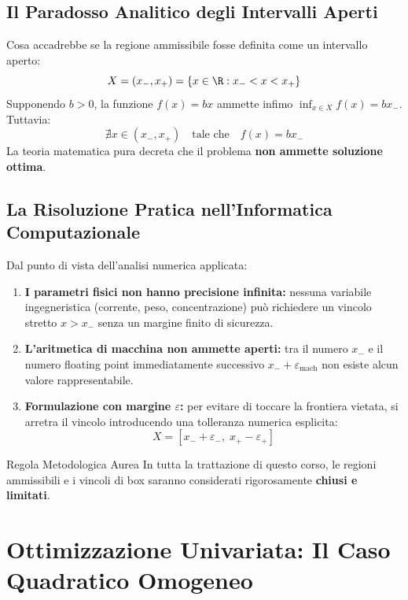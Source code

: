 \subsection{Il Paradosso Analitico degli Intervalli Aperti}
Cosa accadrebbe se la regione ammissibile fosse definita come un intervallo aperto:
\begin{equation}
X = (x_-, x_+) = \{ x \in \R : x_- < x < x_+ \}
\end{equation}
Supponendo $b > 0$, la funzione $f(x) = bx$ ammette infimo $\inf_{x \in X} f(x) = b x_-$. Tuttavia:
\begin{equation}
\nexists x \in (x_-, x_+) \quad \text{tale che} \quad f(x) = b x_-
\end{equation}
La teoria matematica pura decreta che il problema \textbf{non ammette soluzione ottima}.

\subsection{La Risoluzione Pratica nell'Informatica Computazionale}
Dal punto di vista dell'analisi numerica applicata:
\begin{enumerate}
    \item \textbf{I parametri fisici non hanno precisione infinita:} nessuna variabile ingegneristica (corrente, peso, concentrazione) pu\`o richiedere un vincolo stretto $x > x_-$ senza un margine finito di sicurezza.
    \item \textbf{L'aritmetica di macchina non ammette aperti:} tra il numero $x_-$ e il numero floating point immediatamente successivo $x_- + \varepsilon_{\text{mach}}$ non esiste alcun valore rappresentabile.
    \item \textbf{Formulazione con margine $\varepsilon$:} per evitare di toccare la frontiera vietata, si arretra il vincolo introducendo una tolleranza numerica esplicita:
    \begin{equation}
    X = [x_- + \varepsilon_-, \; x_+ - \varepsilon_+]
    \end{equation}
\end{enumerate}

\begin{noteblock}{Regola Metodologica Aurea}
In tutta la trattazione di questo corso, le regioni ammissibili e i vincoli di box saranno considerati rigorosamente \textbf{chiusi e limitati}.
\end{noteblock}


\FloatBarrier
\section{Ottimizzazione Univariata: Il Caso Quadratico Omogeneo}
\label{sec:opt-caso-quadratico-omogeneo}


